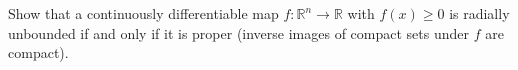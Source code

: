 \bonusquestion[10]
%
Show that a continuously differentiable map $f: \mathbb{R}^n \rightarrow
\mathbb{R}$ with $f(x) \geq 0$ is radially unbounded if and only if it is proper
(inverse images of compact sets under $f$ are compact).